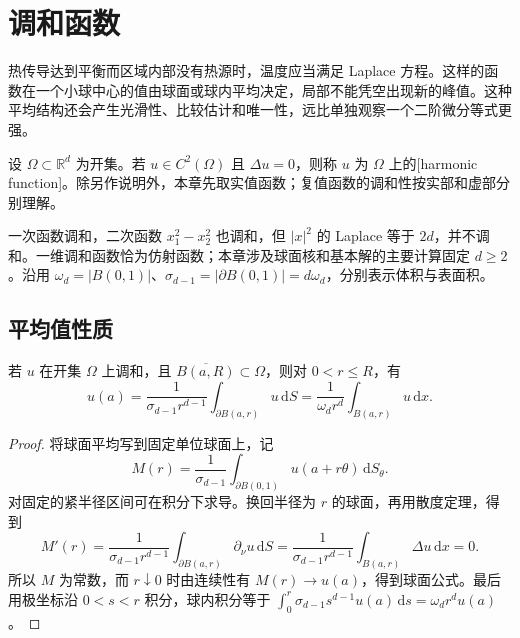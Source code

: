 \section{调和函数}
\label{b2:sec:1301}

热传导达到平衡而区域内部没有热源时，温度应当满足 Laplace 方程。这样的函数在一个小球中心的值由球面或球内平均决定，局部不能凭空出现新的峰值。这种平均结构还会产生光滑性、比较估计和唯一性，远比单独观察一个二阶微分等式更强。

\begin{definition}\label{b2:def:13-harmonic}
设 \(\Omega\subset\mathbb R^d\) 为开集。若 \(u\in C^2(\Omega)\) 且 \(\Delta u=0\)，则称 \(u\) 为 \(\Omega\) 上的[harmonic function]。除另作说明外，本章先取实值函数；复值函数的调和性按实部和虚部分别理解。
\end{definition}

一次函数调和，二次函数 \(x_1^2-x_2^2\) 也调和，但 \(|x|^2\) 的 Laplace 等于 \(2d\)，并不调和。一维调和函数恰为仿射函数；本章涉及球面核和基本解的主要计算固定 \(d\geq2\)。沿用 \(\omega_d=|B(0,1)|\)、\(\sigma_{d-1}=|\partial B(0,1)|=d\omega_d\)，分别表示体积与表面积。

\subsection{平均值性质}
\label{b2:subsec:130101}

\begin{theorem}[调和函数的平均值性质]\label{b2:thm:13-mean-value}
若 \(u\) 在开集 \(\Omega\) 上调和，且 \(\overline{B(a,R)}\subset\Omega\)，则对 \(0<r\leq R\)，有
\[
 u(a)=\dfrac1{\sigma_{d-1}r^{d-1}}\int_{\partial B(a,r)}u\,\mathrm{d}S
 =\dfrac1{\omega_dr^d}\int_{B(a,r)}u\,\mathrm{d}x.
\]
\end{theorem}
\begin{proof}
将球面平均写到固定单位球面上，记
\[
 M(r)=\dfrac1{\sigma_{d-1}}\int_{\partial B(0,1)}u(a+r\theta)\,\mathrm{d}S_\theta.
\]
对固定的紧半径区间可在积分下求导。换回半径为 \(r\) 的球面，再用散度定理，得到
\[
 M'(r)=\dfrac1{\sigma_{d-1}r^{d-1}}
          \int_{\partial B(a,r)}\partial_\nu u\,\mathrm{d}S
       =\dfrac1{\sigma_{d-1}r^{d-1}}\int_{B(a,r)}\Delta u\,\mathrm{d}x=0.
\]
所以 \(M\) 为常数，而 \(r\downarrow0\) 时由连续性有 \(M(r)\to u(a)\)，得到球面公式。最后用极坐标沿 \(0<s<r\) 积分，球内积分等于 \(\int_0^r\sigma_{d-1}s^{d-1}u(a)\,\mathrm{d}s=\omega_dr^du(a)\)。
\end{proof}

